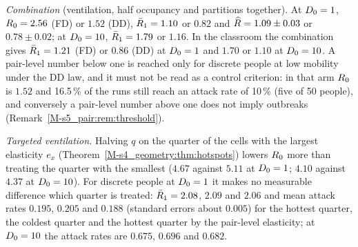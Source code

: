 \emph{Combination} (ventilation, half occupancy and partitions together). At $D_0=1$, $R_0=2.56$ (FD) or $1.52$
(DD), $\bar{R}_1=1.10$ or $0.82$ and $\widehat{R}=1.09\pm0.03$ or $0.78\pm0.02$; at $D_0=10$, $\bar{R}_1=1.79$ or
$1.16$. In the classroom the combination gives $\bar{R}_1=1.21$ (FD) or $0.86$ (DD) at $D_0=1$ and $1.70$ or
$1.10$ at $D_0=10$.
A pair-level number below one is reached only for discrete people at low mobility under the DD law, and it
must not be read as a control criterion: in that arm $R_0$ is $1.52$ and 16.5\,\% of the runs still reach an
attack rate of 10\,\% (five of 50 people), and conversely a pair-level number above one does not imply
outbreaks (Remark~\ref{M-s5_pair:rem:threshold}).

\emph{Targeted ventilation.} Halving $q$ on the quarter of the cells with the largest elasticity $e_x$
(Theorem~\ref{M-s4_geometry:thm:hotspots}) lowers $R_0$ more than treating the quarter with the smallest ($4.67$
against $5.11$ at $D_0=1$; $4.10$ against $4.37$ at $D_0=10$). For discrete people at $D_0=1$ it makes no
measurable difference which quarter is treated: $\bar{R}_1=2.08$, $2.09$ and $2.06$ and mean attack rates
$0.195$, $0.205$ and $0.188$ (standard errors about $0.005$) for the hottest quarter, the coldest quarter and the hottest
quarter by the pair-level elasticity; at $D_0=10$ the attack rates are $0.675$, $0.696$ and $0.682$.

